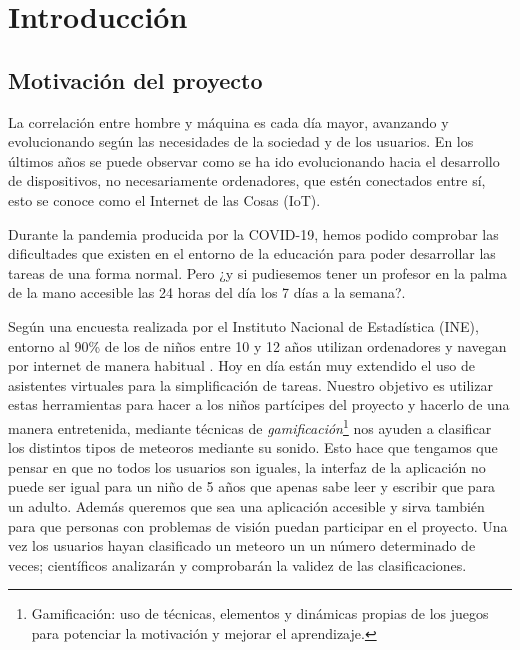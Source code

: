 \chapter{Introducción}
\section{Motivación del proyecto}


La correlación entre hombre y máquina es cada día mayor, avanzando y evolucionando según las necesidades de la sociedad y de los usuarios. En los últimos años se puede observar como se ha ido evolucionando hacia el desarrollo de dispositivos, no necesariamente ordenadores, que estén conectados entre sí, esto se conoce como el Internet de las Cosas (IoT).

Durante la pandemia producida por la COVID-19, hemos podido comprobar las dificultades que existen en el entorno de la educación para poder desarrollar las tareas de una forma normal. Pero ¿y si pudiesemos tener un profesor en la palma de la mano accesible las 24 horas del día los 7 días a la semana?. 

Según una encuesta realizada por el Instituto Nacional de Estadística (INE), entorno al 90\% de los de niños entre 10 y 12 años utilizan ordenadores y navegan por internet de manera habitual \cite{INE}. Hoy en día están muy extendido el uso de asistentes virtuales para la simplificación de tareas. Nuestro objetivo es utilizar estas herramientas para hacer a los niños partícipes  del proyecto y hacerlo de una manera entretenida, mediante técnicas de \textit{gamificación}\footnote{Gamificación: uso de técnicas, elementos y dinámicas propias de los juegos para potenciar la motivación y mejorar el aprendizaje.} nos ayuden a clasificar los distintos tipos de meteoros mediante su sonido.
Esto hace que tengamos que pensar en que no todos los usuarios son iguales, la interfaz de la aplicación no puede ser igual para un niño de 5 años que apenas sabe leer y escribir que para un adulto. Además queremos que sea una aplicación accesible y sirva también para que personas con problemas de visión puedan participar en el proyecto.
Una vez los usuarios hayan clasificado un meteoro un un número determinado de veces; científicos analizarán y comprobarán la validez de las clasificaciones.
  


\vspace*{1.5cm}


